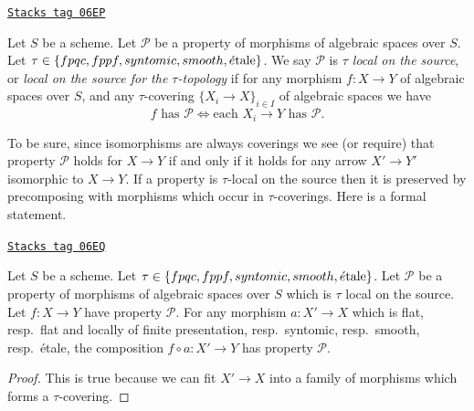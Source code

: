 \begin{definition}
\label{spaces-descent-definition-property-morphisms-local-source}
\href{https://stacks.math.columbia.edu/tag/06EP}{\texttt{Stacks tag 06EP}}

Let $S$ be a scheme.
Let $\mathcal{P}$ be a property of morphisms of algebraic spaces over $S$.
Let $\tau \in \{fpqc, \linebreak[0] fppf, \linebreak[0] syntomic, \linebreak[0]
smooth, \linebreak[0] \etale\}$. We say $\mathcal{P}$ is
{\it $\tau$ local on the source}, or
{\it local on the source for the $\tau$-topology} if for
any morphism $f : X \to Y$ of algebraic spaces over $S$, and any
$\tau$-covering $\{X_i \to X\}_{i \in I}$ of algebraic spaces we have
$$
f \text{ has }\mathcal{P}
\Leftrightarrow
\text{each }X_i \to Y\text{ has }\mathcal{P}.
$$
\end{definition}

To be sure, since isomorphisms are always coverings
we see (or require) that property $\mathcal{P}$ holds for $X \to Y$
if and only if it holds for any arrow $X' \to Y'$ isomorphic to $X \to Y$.
If a property is $\tau$-local on the source then it is preserved by
precomposing with morphisms which occur in $\tau$-coverings. Here
is a formal statement.

\begin{lemma}
\label{spaces-descent-lemma-precompose-property-local-source}
\href{https://stacks.math.columbia.edu/tag/06EQ}{\texttt{Stacks tag 06EQ}}

Let $S$ be a scheme.
Let $\tau \in \{fpqc, \linebreak[0] fppf, \linebreak[0] syntomic, \linebreak[0]
smooth, \linebreak[0] \etale\}$.
Let $\mathcal{P}$ be a property of morphisms of algebraic spaces over $S$
which is $\tau$ local on the source. Let $f : X \to Y$ have property
$\mathcal{P}$. For any morphism $a : X' \to X$ which is
flat, resp.\ flat and locally of finite presentation, resp.\ syntomic,
resp.\ smooth, resp.\ \'etale, the composition $f \circ a : X' \to Y$ has
property $\mathcal{P}$.
\end{lemma}

\begin{proof}
This is true because we can fit $X' \to X$ into a family of
morphisms which forms a $\tau$-covering.
\end{proof}

